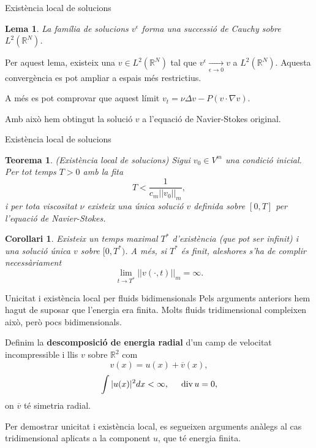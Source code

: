 \documentclass{beamer}
\DeclareMathOperator{\diver}{div}
\newtheorem{teorema}{Teorema}
\newtheorem{corollari}{Corol\textperiodcentered lari}
\newtheorem{lema}{Lema}
\begin{document}
\begin{frame}{Exist\`{e}ncia local de solucions}
\begin{lema}
La fam\'{i}lia de solucions $v^{\epsilon}$ forma una successi\'{o} de Cauchy sobre $L^2(\mathbb{R}^N)$.
\end{lema}
\pause
Per aquest lema, existeix una $v\in L^2(\mathbb{R}^N)$ tal que $v^{\epsilon}\xrightarrow[\epsilon\to0]{}v$ a $L^2(\mathbb{R}^N)$. Aquesta converg\`{e}ncia es pot ampliar a espais m\'{e}s restrictius.
\vspace{3mm}
\pause

A m\'{e}s es pot comprovar que aquest l\'{i}mit $v_t=\nu\Delta v-P(v\cdot\nabla v)$.
\vspace{3mm}
\pause

Amb aix\`{o} hem obtingut la soluci\'{o} $v$ a l'equaci\'{o} de Navier-Stokes original.
\end{frame}

\begin{frame}{Exist\`{e}ncia local de solucions}
\begin{teorema}
(Exist\`{e}ncia local de solucions) Sigui $v_0\in V^m$ una condici\'{o} inicial. Per tot temps $T>0$ amb la fita
\[T<\frac{1}{c_m||v_0||_m},\]
i per tota viscositat $\nu$ existeix una \'{u}nica soluci\'{o} $v$ definida sobre $[0,T]$ per l'equaci\'{o} de Navier-Stokes.
\end{teorema}
\pause
\begin{corollari}
Existeix un temps maximal $T^*$ d'exist\`{e}ncia (que pot ser infinit) i una soluci\'{o} \'{u}nica $v$ sobre $[0,T^*)$. A m\'{e}s, si $T^*$ \'{e}s finit, aleshores s'ha de complir necess\`{a}riament
\[\lim_{t\to T^*}||v(\cdot,t)||_m=\infty.\]
\end{corollari}
\end{frame}

\begin{frame}{Unicitat i exist\`{e}ncia local per fluids bidimensionals}
Pels arguments anteriors hem hagut de suposar que l'energia era finita. Molts fluids tridimensional compleixen aix\`{o}, per\`{o} pocs bidimensionals.
\pause
\vspace{2mm}

Definim la \textbf{descomposici\'{o} de energia radial} d'un camp de velocitat incompressible i llis $v$ sobre $\mathbb{R}^2$ com
\[v(x)=u(x)+\overline v(x),\]
\pause
\[\int|u(x)|^2dx<\infty,\hspace{5mm}\diver u=0,\]
\pause
on $\overline v$ t\'{e} simetria radial.
\pause

Per demostrar unicitat i exist\`{e}ncia local, es segueixen arguments an\`{a}legs al cas tridimensional aplicats a la component $u$, que t\'{e} energia finita.
\end{frame}
\end{document}

